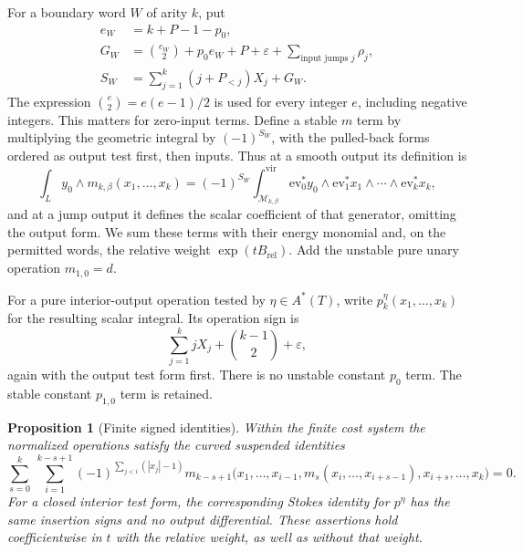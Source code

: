 \documentclass[11pt]{article}
\newtheorem{proposition}[theorem]{Proposition}
\theoremstyle{definition}
\theoremstyle{remark}
\numberwithin{equation}{section}
\begin{document}
For a boundary word $W$ of arity $k$, put
\begin{equation}
 \label{obs:normalization}
 \begin{split}
 e_W&=k+P-1-p_0,\\
 G_W&=\binom{e_W}{2}+p_0e_W+P+\varepsilon
                  +\sum_{\text{input jumps }j}\rho_j,\\
 S_W&=\sum_{j=1}^k(j+P_{<j})X_j+G_W.
 \end{split}
\end{equation}
The expression $\binom e2=e(e-1)/2$ is used for every integer $e$,
including negative integers.  This matters for zero-input terms.
Define a stable $m$ term by multiplying the geometric integral by
$(-1)^{S_W}$, with the pulled-back forms ordered as output test
first, then inputs.  Thus at a smooth output its definition is
\[
 \int_L y_0\wedge m_{k,\beta}(x_1,\ldots,x_k)
 =(-1)^{S_W}
   \int_{\mathcal M_{k,\beta}}^{\mathrm{vir}}
          \mathrm{ev}_0^*y_0\wedge
          \mathrm{ev}_1^*x_1\wedge\cdots\wedge
          \mathrm{ev}_k^*x_k,
\]
and at a jump output it defines the scalar coefficient of that
generator, omitting the output form.  We sum these terms with their
energy monomial and, on the permitted words, the relative weight
$\exp(tB_{\mathrm{rel}})$.  Add the unstable pure unary operation
$m_{1,0}=d$.

For a pure interior-output operation tested by $\eta\in A^*(T)$,
write $p_k^\eta(x_1,\ldots,x_k)$ for the resulting scalar integral.
Its operation sign is
\begin{equation}
 \label{obs:p-normalization}
 \sum_{j=1}^k jX_j+\binom{k-1}{2}+\varepsilon,
\end{equation}
again with the output test form first.  There is no unstable
constant $p_0$ term.  The stable constant $p_{1,0}$ term is retained.

\begin{proposition}[Finite signed identities]\label{obs:ainfinity}
Within the finite cost system the normalized operations satisfy
the curved suspended identities
\begin{equation}
 \label{obs:ainfinity-equation}
 \sum_{s=0}^k\ \sum_{i=1}^{k-s+1}
 (-1)^{\sum_{j<i}(|x_j|-1)}
 m_{k-s+1}\bigl(x_1,\ldots,x_{i-1},
       m_s(x_i,\ldots,x_{i+s-1}),
       x_{i+s},\ldots,x_k\bigr)=0.
\end{equation}
For a closed interior test form, the corresponding Stokes identity
for $p^\eta$ has the same insertion signs and no output
differential.  These assertions hold coefficientwise in $t$ with
the relative weight, as well as without that weight.
\end{proposition}
\end{document}
